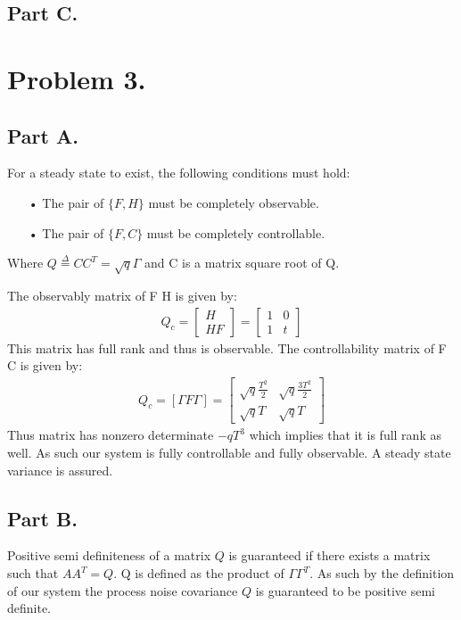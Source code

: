 \documentclass{article}
\begin{document}
\subsection*{Part C.}

\clearpage
\section*{Problem 3.}

\subsection*{Part A.}
For a steady state to exist, the following conditions must hold:
\begin{enumerate}
\item[•] The pair of $\{F, H\}$ must be completely observable.
\item[•] The pair of $\{F, C\}$ must be completely controllable.
\end{enumerate}
Where $Q\overset{\Delta}{=}CC^T = \sqrt{q} \Gamma$ and C is a matrix square root of Q.

The observably matrix of F H is given by:
\begin{align*}
Q_c = \begin{bmatrix} H \\ HF \end{bmatrix} = \begin{bmatrix}
1 & 0 \\
1 & t
\end{bmatrix}
\end{align*}
This matrix has full rank and thus is observable.
The controllability matrix of F C is given by:
\begin{align*}
Q_c = [\Gamma F \Gamma] = \begin{bmatrix}
\sqrt{q} \frac{T^2}{2} & \sqrt{q} \frac{3T^2}{2} \\
\sqrt{q} T & \sqrt{q} T
\end{bmatrix}
\end{align*}
Thus matrix has nonzero determinate $-q T^3$ which implies that it is full rank as well.
As such our system is fully controllable and fully observable. A steady state variance is assured.

\subsection*{Part B.}

Positive semi definiteness of a matrix $Q$ is guaranteed if there exists a matrix such that $AA^T = Q$. Q is defined as the product of $\Gamma \Gamma^T$. As such by the definition of our system the process noise covariance $Q$ is guaranteed to be positive semi definite.
\end{document}
